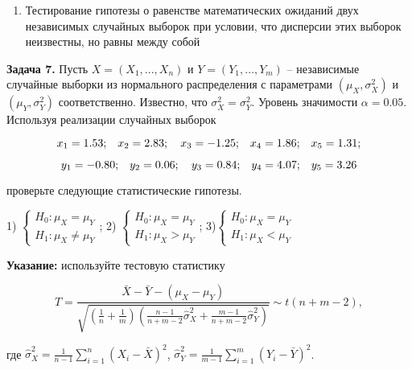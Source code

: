\begin{enumerate}
\item  Тестирование гипотезы о равенстве математических ожиданий двух независимых случайных выборок при условии, что дисперсии этих выборок неизвестны, но равны между собой 
\end{enumerate}



\textbf{Задача 7.} Пусть $X=\left(X_{1} ,...,X_{n} \right)$ и $Y=\left(Y_{1} ,...,Y_{m} \right)$ -- независимые случайные выборки из нормального распределения с параметрами $\left(\mu _{X} ,\sigma _{X}^{2} \right)$ и $\left(\mu _{Y} ,\sigma _{Y}^{2} \right)$ соответственно. Известно, что $\sigma _{X}^{2} =\sigma _{Y}^{2} $. Уровень значимости $\alpha =0.05$. Используя реализации случайных выборок 

\[x_{1} ={\rm 1.53;}\quad x_{2} ={\rm 2.83};\quad x_{3} =-{\rm 1.25;}\quad x_{4} ={\rm 1.86;}\quad x_{5} ={\rm 1.31;}\] 

\[y_{1} =-{\rm 0.80;}\quad y_{2} ={\rm 0.06};\quad y_{3} ={\rm 0.84;}\quad y_{4} ={\rm 4.07;}\quad y_{5} ={\rm 3.26}\] 

проверьте следующие статистические гипотезы.

1) $\left\{\begin{array}{l} {H_{0} :\mu _{X} =\mu _{Y} } \\ {H_{1} :\mu _{X} \ne \mu _{Y} } \end{array}\right. $;             2) $\left\{\begin{array}{l} {H_{0} :\mu _{X} =\mu _{Y} } \\ {H_{1} :\mu _{X} >\mu _{Y} } \end{array}\right. $;             3)$\left\{\begin{array}{l} {H_{0} :\mu _{X} =\mu _{Y} } \\ {H_{1} :\mu _{X} <\mu _{Y} } \end{array}\right. $

\textbf{Указание:} используйте тестовую статистику

\[T=\frac{\bar{X}-\bar{Y}-(\mu _{X} -\mu _{Y} )}{\sqrt{\left({\tfrac{1}{n}} +{\tfrac{1}{m}} \right)\left({\tfrac{n-1}{n+m-2}} \hat{\sigma }_{X}^{2} +{\tfrac{m-1}{n+m-2}} \hat{\sigma }_{Y}^{2} \right)} } \sim t(n+m-2),\] 

где $\hat{\sigma }_{X}^{2} ={\tfrac{1}{n-1}} \sum _{i=1}^{n}(X_{i} -\bar{X})^{2}  $, $\hat{\sigma }_{Y}^{2} ={\tfrac{1}{m-1}} \sum _{i=1}^{m}(Y_{i} -\bar{Y})^{2}  $.




